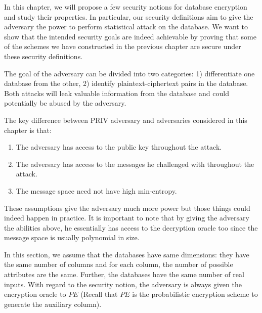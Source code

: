 In this chapter, we will propose a few security notions for database encryption and study their properties. In particular, our security definitions aim to give the adversary the power to perform statistical attack on the database. We want to show that the intended security goals are indeed achievable by proving that some of the schemes we have constructed in the previous chapter are secure under these security definitions.

The goal of the adversary can be divided into two categories: 1) differentiate one database from the other, 2) identify plaintext-ciphertext pairs in the database. Both attacks will leak valuable information from the database and could potentially be abused by the adversary.

The key difference between PRIV adversary and adversaries considered in this chapter is that:
\begin{enumerate}
\item The adversary has access to the public key throughout the attack.
\item The adversary has access to the messages he challenged with throughout the attack.
\item The message space need not have high min-entropy.
\end{enumerate}
These assumptions give the adversary much more power but those things could indeed happen in practice. It is important to note that by giving the adversary the abilities above, he essentially has access to the decryption oracle too since the message space is usually polynomial in size.

In this section, we assume that the databases have same dimensions: they have the same number of columns and for each column, the number of possible attributes are the same. Further, the databases have the same number of real inputs. With regard to the security notion, the adversary is always given the encryption oracle to $PE$ (Recall that $PE$ is the probabilistic encryption scheme to generate the auxiliary column).




